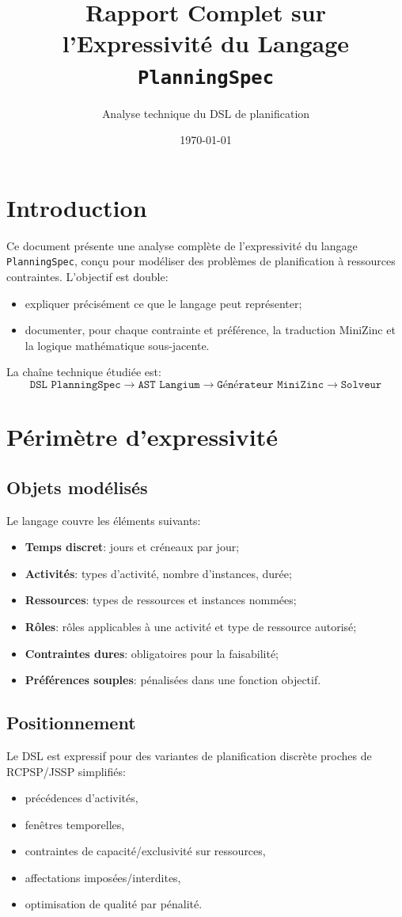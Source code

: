 \documentclass[12pt,a4paper]{article}
\title{Rapport Complet sur l'Expressivité du Langage \texttt{PlanningSpec}}
\author{Analyse technique du DSL de planification}
\date{\today}
\begin{document}
\maketitle
\tableofcontents
\newpage

\section{Introduction}
Ce document présente une analyse complète de l'expressivité du langage \texttt{PlanningSpec}, conçu pour modéliser des problèmes de planification à ressources contraintes. L'objectif est double:
\begin{itemize}
  \item expliquer précisément ce que le langage peut représenter;
  \item documenter, pour chaque contrainte et préférence, la traduction MiniZinc et la logique mathématique sous-jacente.
\end{itemize}

La chaîne technique étudiée est:
\[
\texttt{DSL PlanningSpec} \rightarrow \texttt{AST Langium} \rightarrow \texttt{Générateur MiniZinc} \rightarrow \texttt{Solveur}
\]

\section{Périmètre d'expressivité}
\subsection{Objets modélisés}
Le langage couvre les éléments suivants:
\begin{itemize}
  \item \textbf{Temps discret}: jours et créneaux par jour;
  \item \textbf{Activités}: types d'activité, nombre d'instances, durée;
  \item \textbf{Ressources}: types de ressources et instances nommées;
  \item \textbf{Rôles}: rôles applicables à une activité et type de ressource autorisé;
  \item \textbf{Contraintes dures}: obligatoires pour la faisabilité;
  \item \textbf{Préférences souples}: pénalisées dans une fonction objectif.
\end{itemize}

\subsection{Positionnement}
Le DSL est expressif pour des variantes de planification discrète proches de RCPSP/JSSP simplifiés:
\begin{itemize}
  \item précédences d'activités,
  \item fenêtres temporelles,
  \item contraintes de capacité/exclusivité sur ressources,
  \item affectations imposées/interdites,
  \item optimisation de qualité par pénalité.
\end{itemize}
\end{document}
